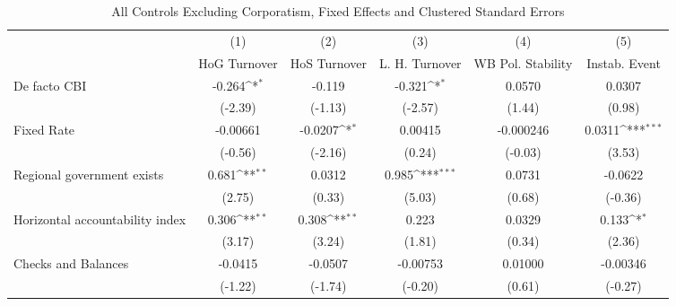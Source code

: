 \begin{table}[htbp]\centering
\def\sym#1{\ifmmode^{#1}\else\(^{#1}\)\fi}
\caption{All Controls Excluding Corporatism, Fixed Effects and Clustered Standard Errors \label{nccmultIndFEDF}}
\begin{tabular}{l*{5}{c}}
\toprule
                                        &\multicolumn{1}{c}{(1)}&\multicolumn{1}{c}{(2)}&\multicolumn{1}{c}{(3)}&\multicolumn{1}{c}{(4)}&\multicolumn{1}{c}{(5)}\\
                                        &\multicolumn{1}{c}{HoG Turnover}&\multicolumn{1}{c}{HoS Turnover}&\multicolumn{1}{c}{L. H. Turnover}&\multicolumn{1}{c}{WB Pol. Stability}&\multicolumn{1}{c}{Instab. Event}\\
\midrule
De facto CBI                            &   -0.264\sym{*}  &   -0.119         &   -0.321\sym{*}  &   0.0570         &   0.0307         \\
                                        &  (-2.39)         &  (-1.13)         &  (-2.57)         &   (1.44)         &   (0.98)         \\
\addlinespace
Fixed Rate                              & -0.00661         &  -0.0207\sym{*}  &  0.00415         &-0.000246         &   0.0311\sym{***}\\
                                        &  (-0.56)         &  (-2.16)         &   (0.24)         &  (-0.03)         &   (3.53)         \\
\addlinespace
Regional government exists              &    0.681\sym{**} &   0.0312         &    0.985\sym{***}&   0.0731         &  -0.0622         \\
                                        &   (2.75)         &   (0.33)         &   (5.03)         &   (0.68)         &  (-0.36)         \\
\addlinespace
Horizontal accountability index         &    0.306\sym{**} &    0.308\sym{**} &    0.223         &   0.0329         &    0.133\sym{*}  \\
                                        &   (3.17)         &   (3.24)         &   (1.81)         &   (0.34)         &   (2.36)         \\
\addlinespace
Checks and Balances                     &  -0.0415         &  -0.0507         & -0.00753         &  0.01000         & -0.00346         \\
                                        &  (-1.22)         &  (-1.74)         &  (-0.20)         &   (0.61)         &  (-0.27)         \\

\end{tabular}
\end{table}
